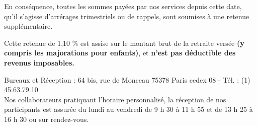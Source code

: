En conséquence, toutes les sommes payées par nos services depuis cette date, qu'il s'agisse d'arrérages trimestriels ou de rappels, sont soumises à une retenue supplémentaire.

Cette retenue de 1,10 \% est assise sur le montant brut de la retraite versée \textbf{(y compris les majorations pour enfants)}, et \textbf{n'est pas déductible des revenus imposables.}

Bureaux et Réception : 64 bis, rue de Monceau 75378 Paris cedex 08 - Tél. : (1) 45.63.79.10\\
Nos collaborateurs pratiquant l'horaire personnalisé, la réception de nos participants est assurée du lundi au vendredi de 9 h 30 à 11 h 55 et de 13 h 25 à 16 h 30 ou sur rendez-vous.
